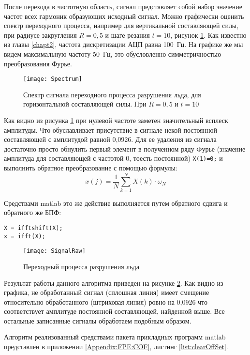 После перехода в частотную область, сигнал представляет собой набор значение частот всех гармоник образующих исходный сигнал. Можно графически оценить спектр переходного процесса, например для вертикальной составляющей силы, при радиусе закругления $ R=0,5 $ и шаге резания $ t=10 $, рисунок \ref{img:Spectrum}. Как известно из главы \ref{chapt2}, частота дискретизации АЦП равна 100~Гц. На графике же мы видем максимальную частоту 50~Гц, это обусловленно симметричностью преобразования Фурье. 
\begin{figure}[ht] 
	\center
	\texttt{[image: Spectrum]}
	\caption{Спектр сигнала переходного процесса разрушения льда, для горизонтальной составляющей силы. При $ R=0,5 $ и $ t=10 $} 
	\label{img:Spectrum}  
\end{figure}

Как видно из рисунка \ref{img:Spectrum} при нулевой частоте заметен значительный всплеск амплитуды. Что обуславливает присутствие в сигнале некой постоянной составляющей с амплитудой равной 0,0926.  Для ее удаления из сигнала достаточно просто обнулить первый элемент в полученном ряду Фурье (значение амплитуда для составляющей с частотой 0, тоесть постоянной) \lstinline{X(1)=0;} и выполнить обратное преобразование с помощью формулы:
\begin{equation}\label{eq:iFFT}
x(j)=\frac{1}{N}\sum_{k=1}^{N} X(k)\cdot\omega_{N}
\end{equation}

Средствами matlab это же действие выполняется путем обратного сдвига и обратного же БПФ:
\begin{lstlisting}[stepnumber=0]
X = ifftshift(X);
x = ifft(X);
\end{lstlisting}
\begin{figure}[ht] 
	\center
	\texttt{[image: SignalRaw]}
	\caption{Переходный процесса разрушения льда} 
	\label{img:SignalRaw}  
\end{figure}

Результат работы данного алгоритма приведен на рисунке \ref{img:SignalRaw}. Как видно из графика, не обработанный сигнал (сплошная линия) имеет смещение относительно обработанного (штриховая линия) ровно на 0,0926 что соответствует амплитуде постоянной составляющей, найденной выше. Все остальные записанные сигналы обработаем подобным образом.

Алгоритм реализованный средствами пакета прикладных программ matlab представлен в приложении \ref{Appendix:FPE:COF}, листинг \ref{list:clearOffSet}.



